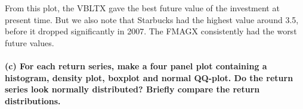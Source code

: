 \documentclass[]{article}
\let\oldparagraph\paragraph
\renewcommand{\paragraph}[1]{\oldparagraph{#1}\mbox{}}
\begin{document}
From this plot, the VBLTX gave the best future value of the investment
at present time. But we also note that Starbucks had the highest value
around 3.5, before it dropped significantly in 2007. The FMAGX
consistently had the worst future values.

\paragraph{(c) For each return series, make a four panel plot containing
a histogram, density plot, boxplot and normal QQ-plot. Do the return
series look normally distributed? Briefly compare the return
distributions.}\label{c-for-each-return-series-make-a-four-panel-plot-containing-a-histogram-density-plot-boxplot-and-normal-qq-plot.-do-the-return-series-look-normally-distributed-briefly-compare-the-return-distributions.}
\end{document}
